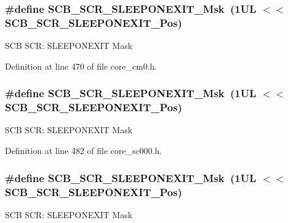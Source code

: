 \subsubsection[{\texorpdfstring{S\+C\+B\+\_\+\+S\+C\+R\+\_\+\+S\+L\+E\+E\+P\+O\+N\+E\+X\+I\+T\+\_\+\+Msk}{SCB_SCR_SLEEPONEXIT_Msk}}]{\setlength{\rightskip}{0pt plus 5cm}\#define S\+C\+B\+\_\+\+S\+C\+R\+\_\+\+S\+L\+E\+E\+P\+O\+N\+E\+X\+I\+T\+\_\+\+Msk~(1\+U\+L $<$$<$ S\+C\+B\+\_\+\+S\+C\+R\+\_\+\+S\+L\+E\+E\+P\+O\+N\+E\+X\+I\+T\+\_\+\+Pos)}\hypertarget{group___c_m_s_i_s___s_c_b_ga50a243e317b9a70781b02758d45b05ee}{}\label{group___c_m_s_i_s___s_c_b_ga50a243e317b9a70781b02758d45b05ee}
S\+CB S\+CR\+: S\+L\+E\+E\+P\+O\+N\+E\+X\+IT Mask 

Definition at line 470 of file core\+\_\+cm0.\+h.

\subsubsection[{\texorpdfstring{S\+C\+B\+\_\+\+S\+C\+R\+\_\+\+S\+L\+E\+E\+P\+O\+N\+E\+X\+I\+T\+\_\+\+Msk}{SCB_SCR_SLEEPONEXIT_Msk}}]{\setlength{\rightskip}{0pt plus 5cm}\#define S\+C\+B\+\_\+\+S\+C\+R\+\_\+\+S\+L\+E\+E\+P\+O\+N\+E\+X\+I\+T\+\_\+\+Msk~(1\+U\+L $<$$<$ S\+C\+B\+\_\+\+S\+C\+R\+\_\+\+S\+L\+E\+E\+P\+O\+N\+E\+X\+I\+T\+\_\+\+Pos)}\hypertarget{group___c_m_s_i_s___s_c_b_ga50a243e317b9a70781b02758d45b05ee}{}\label{group___c_m_s_i_s___s_c_b_ga50a243e317b9a70781b02758d45b05ee}
S\+CB S\+CR\+: S\+L\+E\+E\+P\+O\+N\+E\+X\+IT Mask 

Definition at line 482 of file core\+\_\+sc000.\+h.

\subsubsection[{\texorpdfstring{S\+C\+B\+\_\+\+S\+C\+R\+\_\+\+S\+L\+E\+E\+P\+O\+N\+E\+X\+I\+T\+\_\+\+Msk}{SCB_SCR_SLEEPONEXIT_Msk}}]{\setlength{\rightskip}{0pt plus 5cm}\#define S\+C\+B\+\_\+\+S\+C\+R\+\_\+\+S\+L\+E\+E\+P\+O\+N\+E\+X\+I\+T\+\_\+\+Msk~(1\+U\+L $<$$<$ S\+C\+B\+\_\+\+S\+C\+R\+\_\+\+S\+L\+E\+E\+P\+O\+N\+E\+X\+I\+T\+\_\+\+Pos)}\hypertarget{group___c_m_s_i_s___s_c_b_ga50a243e317b9a70781b02758d45b05ee}{}\label{group___c_m_s_i_s___s_c_b_ga50a243e317b9a70781b02758d45b05ee}
S\+CB S\+CR\+: S\+L\+E\+E\+P\+O\+N\+E\+X\+IT Mask 

